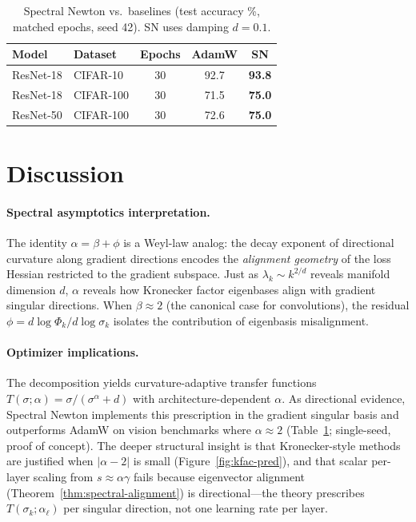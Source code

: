 \documentclass{article}
\begin{document}
\begin{table}[t]
\centering
\caption{Spectral Newton vs.\ baselines (test accuracy \%, matched epochs, seed 42). SN uses damping $d{=}0.1$.}
\label{tab:sn-vision}
\small
\begin{tabular}{llccc}
\toprule
\textbf{Model} & \textbf{Dataset} & Epochs & AdamW & SN \\
\midrule
ResNet-18 & CIFAR-10 & 30 & 92.7 & \textbf{93.8} \\
ResNet-18 & CIFAR-100 & 30 & 71.5 & \textbf{75.0} \\
ResNet-50 & CIFAR-100 & 30 & 72.6 & \textbf{75.0} \\
\bottomrule
\end{tabular}
\end{table}

\section{Discussion}\label{sec:discussion}

\paragraph{Spectral asymptotics interpretation.}
The identity $\alpha = \beta + \phi$ is a Weyl-law analog: the decay exponent of directional curvature along gradient directions encodes the \emph{alignment geometry} of the loss Hessian restricted to the gradient subspace. Just as $\lambda_k \sim k^{2/d}$ reveals manifold dimension $d$, $\alpha$ reveals how Kronecker factor eigenbases align with gradient singular directions. When $\beta \approx 2$ (the canonical case for convolutions), the residual $\phi = d\log\Phi_k/d\log\sigma_k$ isolates the contribution of eigenbasis misalignment.

\paragraph{Optimizer implications.}
The decomposition yields curvature-adaptive transfer functions $T(\sigma;\alpha) = \sigma/(\sigma^\alpha + d)$ with architecture-dependent $\alpha$. As directional evidence, Spectral Newton implements this prescription in the gradient singular basis and outperforms AdamW on vision benchmarks where $\alpha \approx 2$ (Table~\ref{tab:sn-vision}; single-seed, proof of concept). The deeper structural insight is that Kronecker-style methods are justified when $|\alpha-2|$ is small (Figure~\ref{fig:kfac-pred}), and that scalar per-layer scaling from $s \approx \alpha\gamma$ fails because eigenvector alignment (Theorem~\ref{thm:spectral-alignment}) is directional---the theory prescribes $T(\sigma_k;\alpha_\ell)$ per singular direction, not one learning rate per layer.
\end{document}
